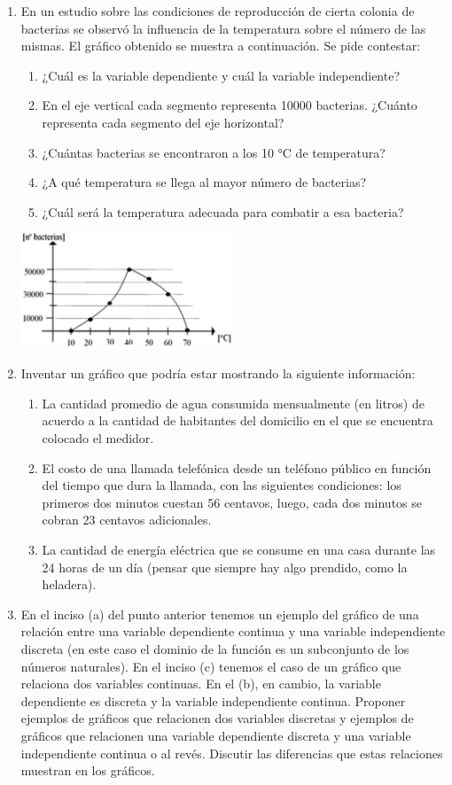 \documentclass[12pt]{article}
\theoremstyle{definition}
\begin{document}
\begin{enumerate}
\item  En un estudio sobre las condiciones de reproducción de cierta colonia de bacterias se observó la influencia de la temperatura sobre el número de las mismas. El gráfico obtenido se muestra a continuación. Se pide contestar:
\begin{enumerate} [leftmargin=2cm]
\item ¿Cuál es la variable dependiente y cuál la variable independiente?
\item En el eje vertical cada segmento representa 10000 bacterias. ¿Cuánto representa cada segmento del eje horizontal?
\item ¿Cuántas bacterias se encontraron a los 10 °C de temperatura?
\item ¿A qué temperatura se llega al mayor número de bacterias? 
\item ¿Cuál será la temperatura adecuada para combatir a esa bacteria?
\end{enumerate}
\begin{center} 
\includegraphics[width=0.5\textwidth]{tp2_fig6.jpg} 
\end{center}

\item  Inventar un gráfico que podría estar mostrando la siguiente información:
\begin{enumerate} [leftmargin=2cm]
\item La cantidad promedio de agua consumida mensualmente (en litros) de acuerdo a la cantidad de habitantes del domicilio en el que se encuentra colocado el medidor.
\item El costo de una llamada telefónica desde un teléfono público en función del tiempo que dura la llamada, con las siguientes condiciones: los primeros dos minutos cuestan 56 centavos, luego, cada dos minutos se cobran 23 centavos adicionales.
\item La cantidad de energía eléctrica que se consume en una casa durante las 24 horas de un día (pensar que siempre hay algo prendido,  como la heladera). 
\end{enumerate}

\item En el inciso (a) del punto anterior tenemos un ejemplo del gráfico de una relación entre una variable dependiente continua y una variable independiente discreta (en este caso el dominio de la función es un subconjunto de los números naturales). En el inciso (c) tenemos el caso de un gráfico que relaciona dos variables continuas. En el (b), en cambio, la variable dependiente es discreta y la variable independiente continua. Proponer ejemplos de gráficos que relacionen dos variables discretas y ejemplos de gráficos que relacionen una variable dependiente discreta y una variable independiente continua o al revés. Discutir las diferencias que estas relaciones muestran en los gráficos.


\end{enumerate}
\end{document}
